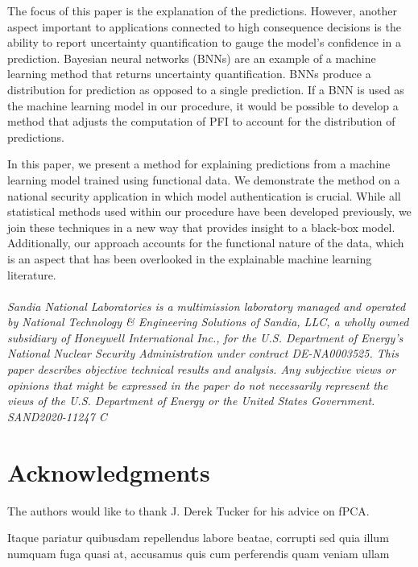 \documentclass[letterpaper]{article}
\begin{document}
The focus of this paper is the explanation of the predictions. However, another aspect important to applications connected to high consequence decisions is the ability to report uncertainty quantification to gauge the model's confidence in a prediction. Bayesian neural networks (BNNs) are an example of a machine learning method that returns uncertainty quantification. BNNs produce a distribution for prediction as opposed to a single prediction. If a BNN is used as the machine learning model in our procedure, it would be possible to develop a method that adjusts the computation of PFI to account for the distribution of predictions.

In this paper, we present a method for explaining predictions from a machine learning model trained using functional data. We demonstrate the method on a national security application in which model authentication is crucial. While all statistical methods used within our procedure have been developed previously, we join these techniques in a new way that provides insight to a black-box model. Additionally, our approach accounts for the functional nature of the data, which is an aspect that has been overlooked in the explainable machine learning literature.\\
\\
\textit{Sandia National Laboratories is a multimission laboratory managed and operated by National Technology \& Engineering Solutions of Sandia, LLC, a wholly owned subsidiary of Honeywell International Inc., for the U.S. Department of Energy's National Nuclear Security Administration under contract DE-NA0003525. This paper describes objective technical results and analysis. Any subjective views or opinions that might be expressed in the paper do not necessarily represent the views of the U.S. Department of Energy or the United States Government. SAND2020-11247 C}

\vspace{-2.12mm}
\section*{Acknowledgments}

The authors would like to thank J. Derek Tucker for his advice on fPCA.

  Itaque pariatur quibusdam repellendus labore beatae, corrupti sed quia illum numquam fuga quasi at, accusamus quis cum perferendis quam veniam ullam

\end{document}
